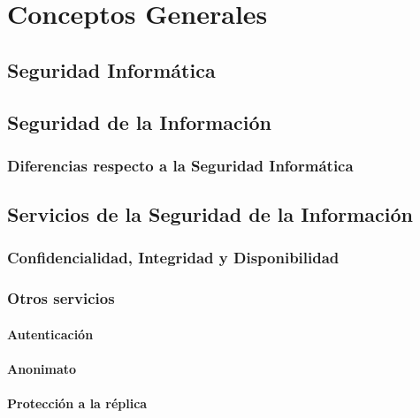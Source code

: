 \chapter{Conceptos Generales}

\section{Seguridad Informática}


\section{Seguridad de la Información}

\subsection{Diferencias respecto a la Seguridad Informática}


\section{Servicios de la Seguridad de la Información}

\subsection[CID]{Confidencialidad, Integridad y Disponibilidad}

\subsection{Otros servicios}

\subsubsection{Autenticación}

\subsubsection{Anonimato}

\subsubsection{Protección a la réplica}